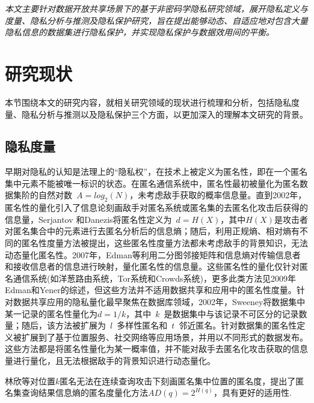 \textit{本文主要针对数据开放共享场景下的基于非密码学隐私研究领域，展开隐私定义与度量、隐私分析与推测及隐私保护研究，旨在提出能够动态、自适应地对包含大量隐私信息的数据集进行隐私保护，并实现隐私保护与数据效用间的平衡。}

\section{研究现状}

本节围绕本文的研究内容，就相关研究领域的现状进行梳理和分析，包括隐私度量、隐私分析与推测以及隐私保护三个方面，以更加深入的理解本文研究的背景。

\subsection{隐私度量}
早期对隐私的认知是法理上的“隐私权”，在技术上被定义为匿名性，即在一个匿名集中元素不能被唯一标识的状态。在匿名通信系统中，匿名性最初被量化为匿名数据集阶的自然对数~$A=log_2(N)$\cite{reiter1998crowds}，未考虑敌手获取的概率信息量。直到2002年，匿名性的量化引入了信息论\cite{serjantov2002towards}刻画敌手对匿名系统或匿名集的去匿名化攻击后获得的信息量，Serjantov 和Danezis\cite{serjantov2002towards}将匿名性定义为~$d=H(X)$，其中$H(X)$是攻击者对匿名集合中的元素进行去匿名分析后的信息熵；随后，利用正规熵\cite{diaz2002towards}、相对熵\cite{deng2006measuring}有不同的匿名性度量方法被提出，这些匿名性度量方法都未考虑敌手的背景知识，无法动态量化匿名性。2007年，Edman等\cite{edman2007combinatorial}利用二分图邻接矩阵和信息熵对传输信息者和接收信息者的信息进行映射，量化匿名性的信息量。这些匿名性的量化仅针对匿名通信系统(如洋葱路由系统，Tor系统和Crowds系统)，更多此类方法见2009年Edman和Yener的综述\cite{edman2009anonymity}，但这些方法并不适用数据共享和应用中的匿名性度量。针对数据共享应用的隐私量化最早聚焦在数据库领域，2002年，Sweeney\cite{sweeney2002k}将数据集中某一记录的匿名性量化为$d=1/k$，其中~$k$~是数据集中与该记录不可区分的记录数量；随后，该方法被扩展为~$l$~多样性匿名\cite{machanavajjhala2007l}和~$t$~邻近匿名\cite{li2007t}。针对数据集的匿名性定义被扩展到了基于位置服务\cite{niu2014achieving}、社交网络\cite{campan2008data}等应用场景，并用以不同形式的数据发布\cite{wong2006k,ying2009comparisons}。这些方法都是将匿名性量化为某一概率值，并不能对敌手去匿名化攻击获取的信息量进行量化，且无法根据敌手的背景知识进行动态量化。

林欣等\cite{lin2009lbs}对位置$k$匿名无法在连续查询攻击下刻画匿名集中位置的匿名度，提出了匿名集查询结果信息熵的匿名度量化方法$AD(q)=2^{H(q)}$，具有更好的适用性.

